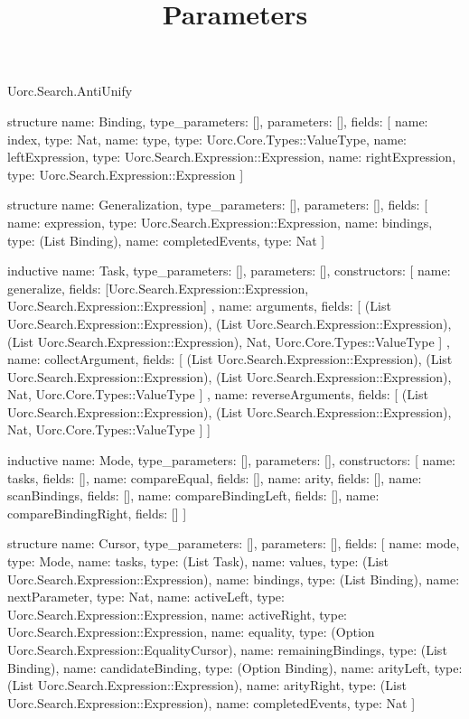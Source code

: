 \begin{lexlean}{Uorc.Search.AntiUnify}
\title{Parameters}
\begin{semanticmodule}
structure{
  name: Binding,
  type_parameters: [],
  parameters: [],
  fields: [
    {name: index, type: Nat},
    {name: type, type: Uorc.Core.Types::ValueType},
    {name: leftExpression, type: Uorc.Search.Expression::Expression},
    {name: rightExpression, type: Uorc.Search.Expression::Expression}
  ]
}

structure{
  name: Generalization,
  type_parameters: [],
  parameters: [],
  fields: [
    {name: expression, type: Uorc.Search.Expression::Expression},
    {name: bindings, type: (List Binding)},
    {name: completedEvents, type: Nat}
  ]
}

inductive{
  name: Task,
  type_parameters: [],
  parameters: [],
  constructors: [
    {
      name: generalize,
      fields: [Uorc.Search.Expression::Expression, Uorc.Search.Expression::Expression]
    },
    {
      name: arguments,
      fields: [
        (List Uorc.Search.Expression::Expression),
        (List Uorc.Search.Expression::Expression),
        (List Uorc.Search.Expression::Expression),
        Nat,
        Uorc.Core.Types::ValueType
      ]
    },
    {
      name: collectArgument,
      fields: [
        (List Uorc.Search.Expression::Expression),
        (List Uorc.Search.Expression::Expression),
        (List Uorc.Search.Expression::Expression),
        Nat,
        Uorc.Core.Types::ValueType
      ]
    },
    {
      name: reverseArguments,
      fields: [
        (List Uorc.Search.Expression::Expression),
        (List Uorc.Search.Expression::Expression),
        Nat,
        Uorc.Core.Types::ValueType
      ]
    }
  ]
}

inductive{
  name: Mode,
  type_parameters: [],
  parameters: [],
  constructors: [
    {name: tasks, fields: []},
    {name: compareEqual, fields: []},
    {name: arity, fields: []},
    {name: scanBindings, fields: []},
    {name: compareBindingLeft, fields: []},
    {name: compareBindingRight, fields: []}
  ]
}

structure{
  name: Cursor,
  type_parameters: [],
  parameters: [],
  fields: [
    {name: mode, type: Mode},
    {name: tasks, type: (List Task)},
    {name: values, type: (List Uorc.Search.Expression::Expression)},
    {name: bindings, type: (List Binding)},
    {name: nextParameter, type: Nat},
    {name: activeLeft, type: Uorc.Search.Expression::Expression},
    {name: activeRight, type: Uorc.Search.Expression::Expression},
    {name: equality, type: (Option Uorc.Search.Expression::EqualityCursor)},
    {name: remainingBindings, type: (List Binding)},
    {name: candidateBinding, type: (Option Binding)},
    {name: arityLeft, type: (List Uorc.Search.Expression::Expression)},
    {name: arityRight, type: (List Uorc.Search.Expression::Expression)},
    {name: completedEvents, type: Nat}
  ]
}


\end{semanticmodule}
\end{lexlean}
